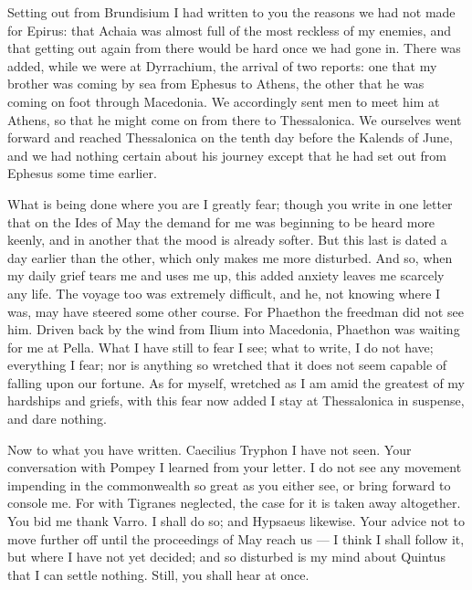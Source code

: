 

 Setting out from Brundisium I had written to you the reasons we had not made for Epirus: that Achaia was almost full of the most reckless of my enemies, and that getting out again from there would be hard once we had gone in. There was added, while we were at Dyrrachium, the arrival of two reports: one that my brother was coming by sea from Ephesus to Athens, the other that he was coming on foot through Macedonia. We accordingly sent men to meet him at Athens, so that he might come on from there to Thessalonica. We ourselves went forward and reached Thessalonica on the tenth day before the Kalends of June, and we had nothing certain about his journey except that he had set out from Ephesus some time earlier.

 What is being done where you are I greatly fear; though you write in one letter that on the Ides of May the demand for me was beginning to be heard more keenly, and in another that the mood is already softer. But this last is dated a day earlier than the other, which only makes me more disturbed. And so, when my daily grief tears me and uses me up, this added anxiety leaves me scarcely any life. The voyage too was extremely difficult, and he, not knowing where I was, may have steered some other course. For Phaethon the freedman did not see him. Driven back by the wind from Ilium into Macedonia, Phaethon was waiting for me at Pella. What I have still to fear I see; what to write, I do not have; everything I fear; nor is anything so wretched that it does not seem capable of falling upon our fortune. As for myself, wretched as I am amid the greatest of my hardships and griefs, with this fear now added I stay at Thessalonica in suspense, and dare nothing.

 Now to what you have written. Caecilius Tryphon I have not seen. Your conversation with Pompey I learned from your letter. I do not see any movement impending in the commonwealth so great as you either see, or bring forward to console me. For with Tigranes neglected, the case for it is taken away altogether. You bid me thank Varro. I shall do so; and Hypsaeus likewise. Your advice not to move further off until the proceedings of May reach us --- I think I shall follow it, but where I have not yet decided; and so disturbed is my mind about Quintus that I can settle nothing. Still, you shall hear at once.

